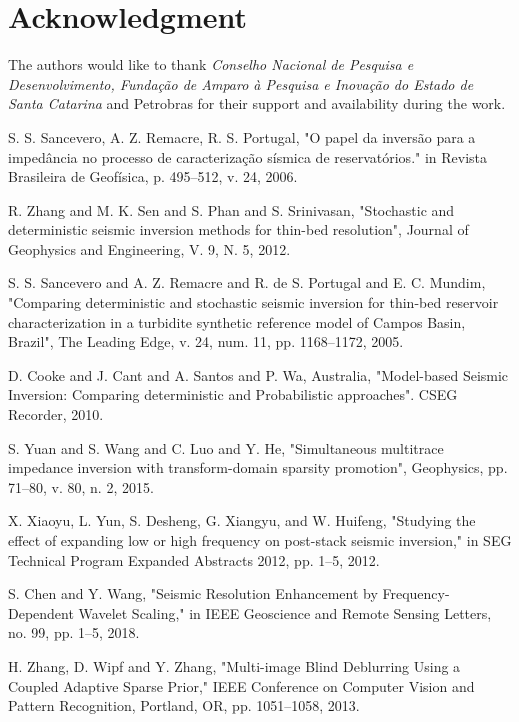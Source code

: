 \documentclass[journal]{IEEEtran}
\begin{document}
\section*{Acknowledgment}

The authors would like to thank \textit{Conselho Nacional de Pesquisa e Desenvolvimento,
Fundação de Amparo à Pesquisa e Inovação do Estado de Santa Catarina} and Petrobras
for their support and availability during the work.

\ifCLASSOPTIONcaptionsoff
  \newpage
\fi

\begin{thebibliography}{1}
S. S. Sancevero, A. Z. Remacre, R. S. Portugal, "O papel da inversão para a impedância no processo de caracterização sísmica de reservatórios." in Revista Brasileira de Geofísica, p. 495--512, v. 24, 2006.

R. Zhang and M. K. Sen and S. Phan and S. Srinivasan, "Stochastic and deterministic seismic inversion methods for thin-bed resolution", Journal of Geophysics and Engineering, V. 9, N. 5, 2012.

S. S. Sancevero and A. Z. Remacre and R. de S. Portugal and E. C. Mundim, "Comparing deterministic and stochastic seismic inversion for thin-bed reservoir characterization in a turbidite synthetic reference model of Campos Basin, Brazil", The Leading Edge, v. 24, num. 11, pp. 1168--1172, 2005. 

D. Cooke and J. Cant and A. Santos and  P. Wa, Australia,  "Model-based Seismic Inversion: Comparing deterministic and Probabilistic approaches". CSEG Recorder, 2010. 

S. Yuan and S. Wang and C. Luo and Y. He, "Simultaneous multitrace impedance inversion with transform-domain sparsity promotion", Geophysics, pp. 71--80, v. 80, n. 2, 2015.

X. Xiaoyu, L. Yun, S. Desheng, G. Xiangyu, and W. Huifeng, "Studying the effect of expanding low or high frequency on post-stack seismic inversion," in SEG Technical Program Expanded Abstracts 2012, pp. 1--5, 2012.

S. Chen and Y. Wang, "Seismic Resolution Enhancement by Frequency-Dependent Wavelet Scaling," in IEEE Geoscience and Remote Sensing Letters, no. 99, pp. 1--5, 2018.

H. Zhang, D. Wipf and Y. Zhang, "Multi-image Blind Deblurring Using a Coupled Adaptive Sparse Prior," IEEE Conference on Computer Vision and Pattern Recognition, Portland, OR, pp. 1051--1058, 2013.


\end{thebibliography}
\end{document}

